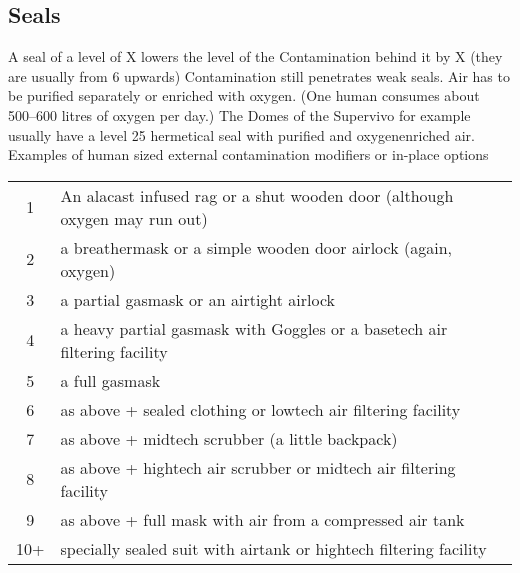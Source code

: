 \subsection{Seals}
A seal of a level of X lowers the level of the Contamination behind it by X (they are usually from 6 upwards)
Contamination still penetrates weak seals.
Air has to be purified separately or enriched with oxygen.
(One human consumes about 500--600 litres of oxygen per day.) The Domes of the Supervivo for
example usually have a level 25 hermetical seal with purified and oxygenenriched air.\vspace{1.5cm}
Examples of human sized external contamination modifiers or in-place options\vspace{1.5cm}
\begin{tabular}{cl}
    1& An alacast infused rag or a shut wooden door (although oxygen may run out)\\
    2& a breathermask or a simple wooden door airlock (again, oxygen)\\
    3& a partial gasmask  or an airtight airlock\\
    4& a heavy partial gasmask with Goggles or a basetech air filtering facility\\
    5& a full gasmask\\
    6& as above + sealed clothing or lowtech air filtering facility\\
    7& as above + midtech scrubber (a little backpack)\\
    8& as above + hightech air scrubber or midtech air filtering facility\\
    9& as above + full mask with air from a compressed air tank\\
    10+& specially sealed suit with airtank or hightech filtering facility\\
\end{tabular}\pagebreak

